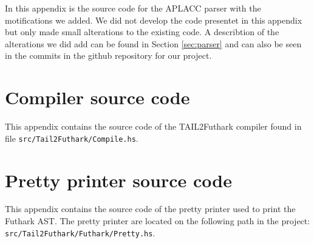 \documentclass[11pt]{article}
\begin{document}
In this appendix is the source code for the APLACC parser \cite{APLACC} with the motifications we added.
We did not develop the code presentet in this appendix but only made small alterations to the existing code. A describtion of the alterations we did add can be found in Section \ref{sec:parser} and can also be seen in the commits in the github repository for our project. 

\lstset{breaklines=true}



\newpage

\section{Compiler source code}
\label{app:impl}

This appendix contains the source code of the TAIL2Futhark compiler found in file {\tt src/Tail2Futhark/Compile.hs}. 


\newpage

\section{Pretty printer source code}
\label{app:pretty}

This appendix contains the source code of the pretty printer used to print the Futhark AST. The pretty printer are located on the following path in the project: {\tt src/Tail2Futhark/Futhark/Pretty.hs}. 



\newpage
\end{document}
